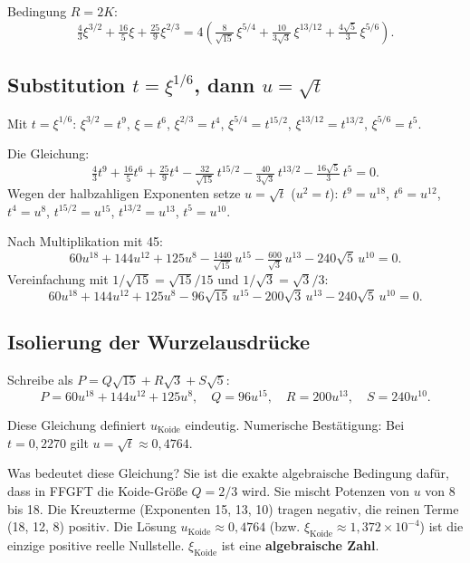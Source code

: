 Bedingung $R=2K$:
\[
  \tfrac{4}{3}\xi^{3/2}+\tfrac{16}{5}\xi+\tfrac{25}{9}\xi^{2/3}
  = 4\!\left(
    \tfrac{8}{\sqrt{15}}\,\xi^{5/4}
   +\tfrac{10}{3\sqrt{3}}\,\xi^{13/12}
   +\tfrac{4\sqrt{5}}{3}\,\xi^{5/6}
  \right).
\]

\subsection{Substitution $t=\xi^{1/6}$, dann $u=\sqrt{t}$}

Mit $t=\xi^{1/6}$:
$\xi^{3/2}=t^9$, $\xi=t^6$, $\xi^{2/3}=t^4$,
$\xi^{5/4}=t^{15/2}$, $\xi^{13/12}=t^{13/2}$, $\xi^{5/6}=t^5$.

Die Gleichung:
\[
  \tfrac{4}{3}t^9+\tfrac{16}{5}t^6+\tfrac{25}{9}t^4
  -\tfrac{32}{\sqrt{15}}\,t^{15/2}
  -\tfrac{40}{3\sqrt{3}}\,t^{13/2}
  -\tfrac{16\sqrt{5}}{3}\,t^5 = 0.
\]
Wegen der halbzahligen Exponenten setze $u=\sqrt{t}$ ($u^2=t$):
$t^9=u^{18}$, $t^6=u^{12}$, $t^4=u^8$,
$t^{15/2}=u^{15}$, $t^{13/2}=u^{13}$, $t^5=u^{10}$.

Nach Multiplikation mit 45:
\[
  60u^{18}+144u^{12}+125u^8
  -\tfrac{1440}{\sqrt{15}}\,u^{15}
  -\tfrac{600}{\sqrt{3}}\,u^{13}
  -240\sqrt{5}\,u^{10} = 0.
\]
Vereinfachung mit $1/\sqrt{15}=\sqrt{15}/15$ und $1/\sqrt{3}=\sqrt{3}/3$:
\[
  60u^{18}+144u^{12}+125u^8
  -96\sqrt{15}\,u^{15}
  -200\sqrt{3}\,u^{13}
  -240\sqrt{5}\,u^{10} = 0.
\]

\subsection{Isolierung der Wurzelausdrücke}

Schreibe als $P=Q\sqrt{15}+R\sqrt{3}+S\sqrt{5}$:
\[
  P=60u^{18}+144u^{12}+125u^8, \quad
  Q=96u^{15}, \quad R=200u^{13}, \quad S=240u^{10}.
\]

Diese Gleichung definiert $u_{\text{Koide}}$ eindeutig.
Numerische Bestätigung: Bei $t=0{,}2270$ gilt $u=\sqrt{t}\approx0{,}4764$.

Was bedeutet diese Gleichung?
Sie ist die exakte algebraische Bedingung dafür, dass in FFGFT die
Koide-Größe $Q=2/3$ wird.
Sie mischt Potenzen von $u$ von 8 bis 18.
Die Kreuzterme (Exponenten 15, 13, 10) tragen negativ,
die reinen Terme (18, 12, 8) positiv.
Die Lösung $u_{\text{Koide}}\approx0{,}4764$
(bzw. $\xi_{\text{Koide}}\approx1{,}372\times10^{-4}$)
ist die einzige positive reelle Nullstelle.
$\xi_{\text{Koide}}$ ist eine \textbf{algebraische Zahl}.

